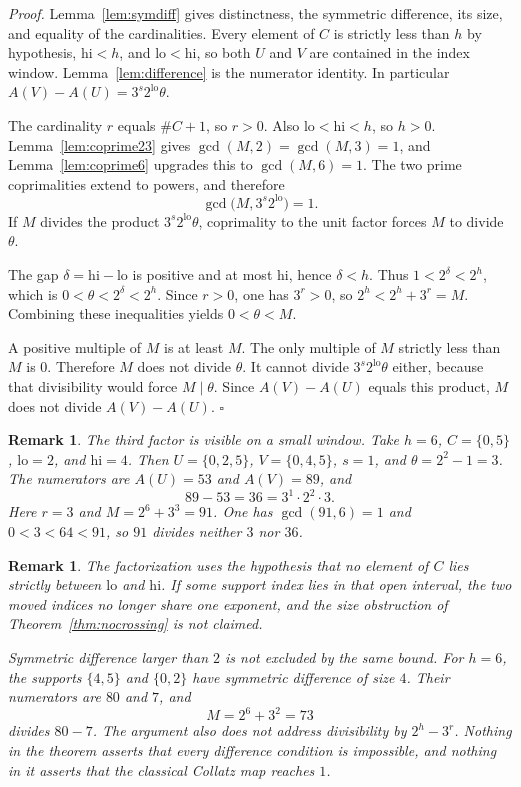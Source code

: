 \documentclass[11pt,letterpaper]{article}
\newtheorem{remark}[theorem]{Remark}
\newenvironment{proof}{\noindent\textit{Proof.}}{\hfill\(\square\)}
\begin{document}
\begin{proof}
Lemma~\ref{lem:symdiff} gives distinctness, the symmetric difference, its size, and equality of the cardinalities. Every element of \(C\) is strictly less than \(h\) by hypothesis, \(\mathrm{hi}<h\), and \(\mathrm{lo}<\mathrm{hi}\), so both \(U\) and \(V\) are contained in the index window. Lemma~\ref{lem:difference} is the numerator identity. In particular \(A(V)-A(U)=3^{s}2^{\mathrm{lo}}\theta\).

The cardinality \(r\) equals \(\#C+1\), so \(r>0\). Also \(\mathrm{lo}<\mathrm{hi}<h\), so \(h>0\). Lemma~\ref{lem:coprime23} gives \(\gcd(M,2)=\gcd(M,3)=1\), and Lemma~\ref{lem:coprime6} upgrades this to \(\gcd(M,6)=1\). The two prime coprimalities extend to powers, and therefore
\[
\gcd\bigl(M,3^{s}2^{\mathrm{lo}}\bigr)=1.
\]
If \(M\) divides the product \(3^{s}2^{\mathrm{lo}}\theta\), coprimality to the unit factor forces \(M\) to divide \(\theta\).

The gap \(\delta=\mathrm{hi}-\mathrm{lo}\) is positive and at most \(\mathrm{hi}\), hence \(\delta<h\). Thus \(1<2^{\delta}<2^{h}\), which is \(0<\theta<2^{\delta}<2^{h}\). Since \(r>0\), one has \(3^{r}>0\), so \(2^{h}<2^{h}+3^{r}=M\). Combining these inequalities yields \(0<\theta<M\).

A positive multiple of \(M\) is at least \(M\). The only multiple of \(M\) strictly less than \(M\) is \(0\). Therefore \(M\) does not divide \(\theta\). It cannot divide \(3^{s}2^{\mathrm{lo}}\theta\) either, because that divisibility would force \(M\mid\theta\). Since \(A(V)-A(U)\) equals this product, \(M\) does not divide \(A(V)-A(U)\).
\end{proof}

\begin{remark}
\label{rem:example}
The third factor is visible on a small window. Take \(h=6\), \(C=\{0,5\}\), \(\mathrm{lo}=2\), and \(\mathrm{hi}=4\). Then \(U=\{0,2,5\}\), \(V=\{0,4,5\}\), \(s=1\), and \(\theta=2^{2}-1=3\). The numerators are \(A(U)=53\) and \(A(V)=89\), and
\[
89-53=36=3^{1}\cdot 2^{2}\cdot 3.
\]
Here \(r=3\) and \(M=2^{6}+3^{3}=91\). One has \(\gcd(91,6)=1\) and \(0<3<64<91\), so \(91\) divides neither \(3\) nor \(36\).
\end{remark}

\begin{remark}
\label{rem:not-claimed}
The factorization uses the hypothesis that no element of \(C\) lies strictly between \(\mathrm{lo}\) and \(\mathrm{hi}\). If some support index lies in that open interval, the two moved indices no longer share one exponent, and the size obstruction of Theorem~\ref{thm:nocrossing} is not claimed.

Symmetric difference larger than \(2\) is not excluded by the same bound. For \(h=6\), the supports \(\{4,5\}\) and \(\{0,2\}\) have symmetric difference of size \(4\). Their numerators are \(80\) and \(7\), and
\[
M=2^{6}+3^{2}=73
\]
divides \(80-7\). The argument also does not address divisibility by \(2^{h}-3^{r}\). Nothing in the theorem asserts that every difference condition is impossible, and nothing in it asserts that the classical Collatz map reaches \(1\).
\end{remark}
\end{document}
